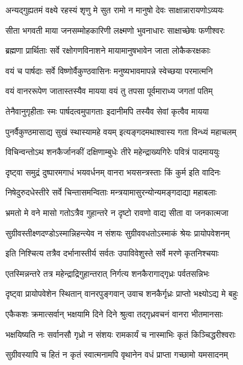 \twolineshloka
{अन्यद्गुह्यतमं वक्ष्ये रहस्यं शृणु मे सुत}
{रामो न मानुषो देवः साक्षान्नारायणोऽव्ययः} %

\twolineshloka
{सीता भगवती माया जनसम्मोहकारिणी}
{लक्ष्मणो भुवनाधारः साक्षाच्छेषः फणीश्वरः} %

\twolineshloka
{ब्रह्मणा प्रार्थिताः सर्वे रक्षोगणविनाशने}
{मायामानुषभावेन जाता लोकैकरक्षकाः} %

\twolineshloka
{वयं च पार्षदाः सर्वे विष्णोर्वैकुण्ठवासिनः}
{मनुष्यभावमापन्ने स्वेच्छया परमात्मनि} %

\twolineshloka
{वयं वानररूपेण जातास्तस्यैव मायया}
{वयं तु तपसा पूर्वमाराध्य जगतां पतिम्} %

\twolineshloka
{तेनैवानुगृहीताः स्मः पार्षदत्वमुपागताः}
{इदानीमपि तस्यैव सेवां कृत्वैव मायया} %

\twolineshloka
{पुनर्वैकुण्ठमासाद्य सुखं स्थास्यामहे वयम्}
{इत्यङ्गदमथाश्वास्य गता विन्ध्यं महाचलम्} %

\twolineshloka
{विचिन्वन्तोऽथ शनकैर्जानकीं दक्षिणाम्बुधेः}
{तीरे महेन्द्राख्यगिरेः पवित्रं पादमाययुः} %

\twolineshloka
{दृष्ट्वा समुद्रं दुष्पारमगाधं भयवर्धनम्}
{वानरा भयसन्त्रस्ताः किं कुर्म इति वादिनः} %

\twolineshloka
{निषेदुरुदधेस्तीरे सर्वे चिन्तासमन्विताः}
{मन्त्रयामासुरन्योन्यमङ्गदाद्या महाबलाः} %

\twolineshloka
{भ्रमतो मे वने मासो गतोऽत्रैव गुहान्तरे}
{न दृष्टो रावणो वाद्य सीता वा जनकात्मजा} %

\twolineshloka
{सुग्रीवस्तीक्ष्णदण्डोऽस्मान्निहन्त्येव न संशयः}
{सुग्रीववधतोऽस्माकं श्रेयः प्रायोपवेशनम्} %

\twolineshloka
{इति निश्चित्य तत्रैव दर्भानास्तीर्य सर्वतः}
{उपाविवेशुस्ते सर्वे मरणे कृतनिश्चयाः} %

\twolineshloka
{एतस्मिन्नन्तरे तत्र महेन्द्राद्रिगुहान्तरात्}
{निर्गत्य शनकैरागाद्गृध्रः पर्वतसन्निभः} %

\twolineshloka
{दृष्ट्वा प्रायोपवेशेन स्थितान् वानरपुङ्गवान्}
{उवाच शनकैर्गृध्रः प्राप्तो भक्ष्योऽद्य मे बहुः} %

\twolineshloka
{एकैकशः क्रमात्सर्वान् भक्षयामि दिने दिने}
{श्रुत्वा तद्गृध्रवचनं वानरा भीतमानसाः} %

\twolineshloka
{भक्षयिष्यति नः सर्वानसौ गृध्रो न संशयः}
{रामकार्यं च नास्माभिः कृतं किञ्चिद्धरीश्वराः} %

\twolineshloka
{सुग्रीवस्यापि च हितं न कृतं स्वात्मनामपि}
{वृथानेन वधं प्राप्ता गच्छामो यमसादनम्} %

